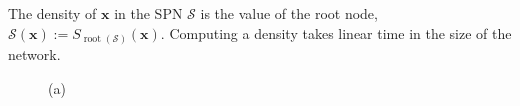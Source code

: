 \documentclass[12pt]{article}
\DeclareMathOperator*{\dagroot}{root}
\begin{document}
The density of $\mathbf{x}$ in the SPN $\mathcal{S}$ is the value of the root node, $\mathcal{S}(\mathbf{x}) := S_{\dagroot(\mathcal{S})}(\mathbf{x})$. Computing a density takes linear time in the size of the network.

\begin{figure}
  \begin{minipage}{0.31\textwidth}
    \centering

    (a)
  \end{minipage}\begin{minipage}{0.31\textwidth}
    \centering


\end{minipage}
\end{figure}
\end{document}
